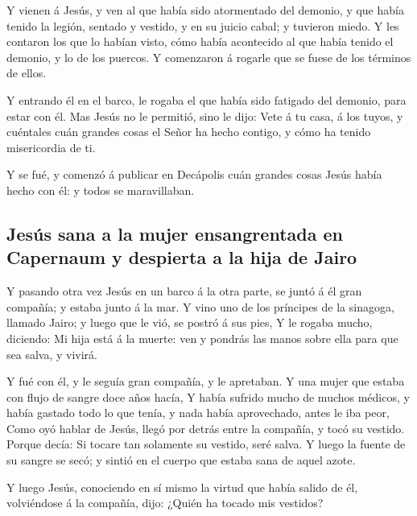  Y vienen á Jesús, y ven al que había sido atormentado
del demonio, y que había tenido la legión, sentado y vestido, y en su
juicio cabal; y tuvieron miedo.  Y les contaron los que
lo habían visto, cómo había acontecido al que había tenido el demonio, y
lo de los puercos.  Y comenzaron á rogarle que se fuese
de los términos de ellos.

 Y entrando él en el barco, le rogaba el que había sido
fatigado del demonio, para estar con él.  Mas Jesús no le
permitió, sino le dijo: Vete á tu casa, á los tuyos, y cuéntales cuán
grandes cosas el Señor ha hecho contigo, y cómo ha tenido misericordia
de ti.

 Y se fué, y comenzó á publicar en Decápolis cuán grandes
cosas Jesús había hecho con él: y todos se maravillaban.

\hypertarget{jesuxfas-sana-a-la-mujer-ensangrentada-en-capernaum-y-despierta-a-la-hija-de-jairo}{%
\subsection{Jesús sana a la mujer ensangrentada en Capernaum y despierta
a la hija de
Jairo}\label{jesuxfas-sana-a-la-mujer-ensangrentada-en-capernaum-y-despierta-a-la-hija-de-jairo}}

 Y pasando otra vez Jesús en un barco á la otra parte, se
juntó á él gran compañía; y estaba junto á la mar.  Y
vino uno de los príncipes de la sinagoga, llamado Jairo; y luego que le
vió, se postró á sus pies,  Y le rogaba mucho, diciendo:
Mi hija está á la muerte: ven y pondrás las manos sobre ella para que
sea salva, y vivirá.

 Y fué con él, y le seguía gran compañía, y le apretaban.
 Y una mujer que estaba con flujo de sangre doce años
hacía,  Y había sufrido mucho de muchos médicos, y había
gastado todo lo que tenía, y nada había aprovechado, antes le iba peor,
 Como oyó hablar de Jesús, llegó por detrás entre la
compañía, y tocó su vestido.  Porque decía: Si tocare tan
solamente su vestido, seré salva.  Y luego la fuente de
su sangre se secó; y sintió en el cuerpo que estaba sana de aquel azote.

 Y luego Jesús, conociendo en sí mismo la virtud que
había salido de él, volviéndose á la compañía, dijo: ¿Quién ha tocado
mis vestidos?

